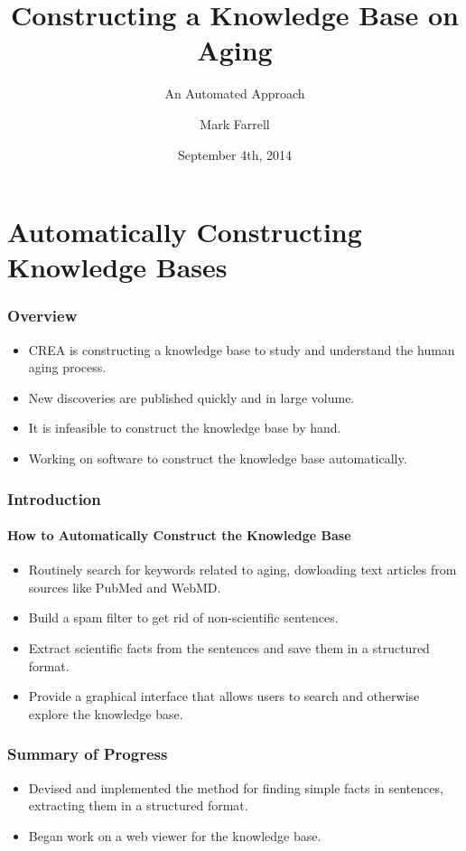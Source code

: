 \documentclass[mathserif]{beamer}
\title{Constructing a Knowledge Base on Aging}
\subtitle{An Automated Approach}
\author{Mark Farrell}
\institute
{

Bioinformatics Researcher \and

\inst{}%
Center for Research and Education on Aging \\
Lawrence Berkeley National Laboratory \\
University of California, Berkeley

}
\date{September 4th, 2014}
\begin{document}
\frame{\titlepage}

\section{Automatically Constructing Knowledge Bases}

\begin{frame}

\frametitle{Overview}

\begin{itemize}[<+->]

\item CREA is constructing a knowledge base to study and
understand the human aging process.
\item New discoveries are published quickly and in large
volume.
\item It is infeasible to construct the knowledge base by
hand.
\item Working on software to construct the knowledge base
automatically.

\end{itemize}

\end{frame}

\begin{frame}

\frametitle{Introduction}
\framesubtitle{How to Automatically Construct the Knowledge Base}

\begin{itemize}[<+->]

\item Routinely search for keywords related to aging, dowloading
text articles from sources like PubMed and WebMD.
\item Build a spam filter to get rid of non-scientific sentences.
\item Extract scientific facts from the sentences and save them
in a structured format.
\item Provide a graphical interface that allows users to search
and otherwise explore the knowledge base.

\end{itemize}

\end{frame}

\begin{frame}

\frametitle{Summary of Progress}

\begin{itemize}[<+->]

\item Devised and implemented the method for finding simple facts
in sentences, extracting them in a structured format.


\item Began work on a web viewer for the knowledge base.

\end{itemize}

\end{frame}
\end{document}
